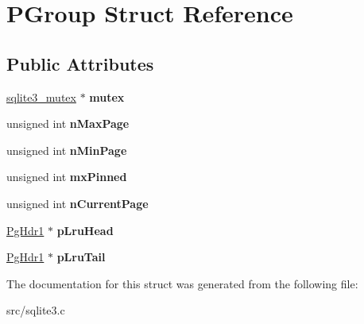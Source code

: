 \hypertarget{struct_p_group}{\section{P\-Group Struct Reference}
\label{struct_p_group}
}
\subsection*{Public Attributes}
\begin{DoxyCompactItemize}
\item 
\hypertarget{struct_p_group_a7173aa723aa61d6b1f79cde2f7d0f74d}{\hyperlink{structsqlite3__mutex}{sqlite3\-\_\-mutex} $\ast$ {\bfseries mutex}}\label{struct_p_group_a7173aa723aa61d6b1f79cde2f7d0f74d}

\item 
\hypertarget{struct_p_group_a219ff89d38529cbb6b47e60f41896f41}{unsigned int {\bfseries n\-Max\-Page}}\label{struct_p_group_a219ff89d38529cbb6b47e60f41896f41}

\item 
\hypertarget{struct_p_group_aedf84324cb7138c9f9ee31814e8274c0}{unsigned int {\bfseries n\-Min\-Page}}\label{struct_p_group_aedf84324cb7138c9f9ee31814e8274c0}

\item 
\hypertarget{struct_p_group_ac7cdffac1c20d260e8230dba4ab05cea}{unsigned int {\bfseries mx\-Pinned}}\label{struct_p_group_ac7cdffac1c20d260e8230dba4ab05cea}

\item 
\hypertarget{struct_p_group_a532a09e3e6bf7a20a934764b4bd698a5}{unsigned int {\bfseries n\-Current\-Page}}\label{struct_p_group_a532a09e3e6bf7a20a934764b4bd698a5}

\item 
\hypertarget{struct_p_group_a3d8ff5ee67a873462209676d0fc4c5a2}{\hyperlink{struct_pg_hdr1}{Pg\-Hdr1} $\ast$ {\bfseries p\-Lru\-Head}}\label{struct_p_group_a3d8ff5ee67a873462209676d0fc4c5a2}

\item 
\hypertarget{struct_p_group_a2c58c2f107352bccedc6e49b5f07a486}{\hyperlink{struct_pg_hdr1}{Pg\-Hdr1} $\ast$ {\bfseries p\-Lru\-Tail}}\label{struct_p_group_a2c58c2f107352bccedc6e49b5f07a486}

\end{DoxyCompactItemize}


The documentation for this struct was generated from the following file\-:\begin{DoxyCompactItemize}
\item 
src/sqlite3.\-c\end{DoxyCompactItemize}
